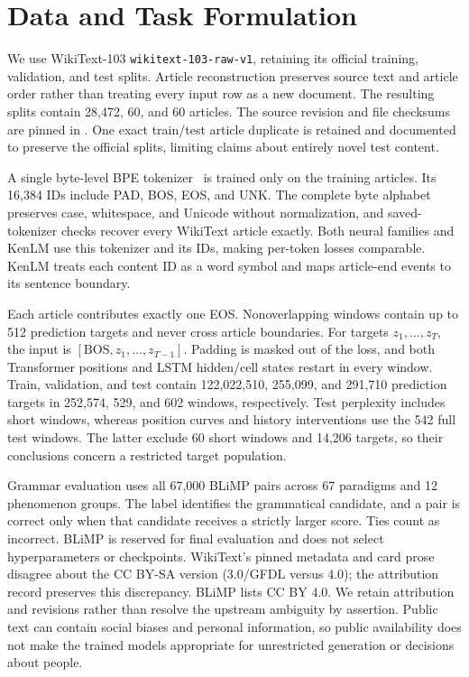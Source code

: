 \documentclass[10pt]{article}
\begin{document}
\section{Data and Task Formulation}

We use WikiText-103 \texttt{wikitext-103-raw-v1}, retaining its official training, validation, and test splits. Article reconstruction preserves source text and article order rather than treating every input row as a new document. The resulting splits contain 28,472, 60, and 60 articles. The source revision and file checksums are pinned in . One exact train/test article duplicate is retained and documented to preserve the official splits, limiting claims about entirely novel test content.

A single byte-level BPE tokenizer~\cite{sennrich2016subword} is trained only on the training articles. Its 16,384 IDs include PAD, BOS, EOS, and UNK. The complete byte alphabet preserves case, whitespace, and Unicode without normalization, and saved-tokenizer checks recover every WikiText article exactly. Both neural families and KenLM use this tokenizer and its IDs, making per-token losses comparable. KenLM treats each content ID as a word symbol and maps article-end events to its sentence boundary.

Each article contributes exactly one EOS. Nonoverlapping windows contain up to 512 prediction targets and never cross article boundaries. For targets $z_1,\ldots,z_T$, the input is $[\mathrm{BOS},z_1,\ldots,z_{T-1}]$. Padding is masked out of the loss, and both Transformer positions and LSTM hidden/cell states restart in every window. Train, validation, and test contain 122,022,510, 255,099, and 291,710 prediction targets in 252,574, 529, and 602 windows, respectively. Test perplexity includes short windows, whereas position curves and history interventions use the 542 full test windows. The latter exclude 60 short windows and 14,206 targets, so their conclusions concern a restricted target population.

Grammar evaluation uses all 67,000 BLiMP pairs across 67 paradigms and 12 phenomenon groups. The label identifies the grammatical candidate, and a pair is correct only when that candidate receives a strictly larger score. Ties count as incorrect. BLiMP is reserved for final evaluation and does not select hyperparameters or checkpoints. WikiText's pinned metadata and card prose disagree about the CC BY-SA version (3.0/GFDL versus 4.0); the attribution record preserves this discrepancy. BLiMP lists CC BY 4.0. We retain attribution and revisions rather than resolve the upstream ambiguity by assertion. Public text can contain social biases and personal information, so public availability does not make the trained models appropriate for unrestricted generation or decisions about people.
\end{document}
